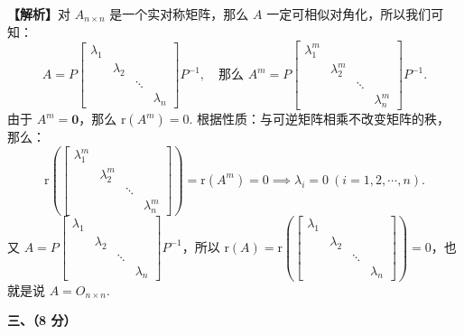 \documentclass[a4paper,11pt]{ctexart}
\newcommand{\rk}{\mathrm{r}}
\begin{document}
\begin{enumerate}[label=\arabic*., leftmargin=2em, itemsep=0.75em, topsep=0.5em]
  \textbf{【解析】}对 $A_{n \times n}$ 是一个实对称矩阵，那么 $A$ 一定可相似对角化，所以我们可知：
  \[
    A = P \begin{bmatrix} \lambda_1 & & & \\ & \lambda_2 & & \\ & & \ddots & \\ & & & \lambda_n \end{bmatrix} P^{-1},
    \quad\text{那么 }
    A^m = P \begin{bmatrix} \lambda_1^m & & & \\ & \lambda_2^m & & \\ & & \ddots & \\ & & & \lambda_n^m \end{bmatrix} P^{-1}.
  \]
  由于 $A^m = \mathbf{0}$，那么 $\rk(A^m) = 0$. 根据性质：与可逆矩阵相乘不改变矩阵的秩，那么：
  \[
    \rk\left(\begin{bmatrix} \lambda_1^m & & & \\ & \lambda_2^m & & \\ & & \ddots & \\ & & & \lambda_n^m \end{bmatrix}\right) = \rk(A^m) = 0 \implies \lambda_i = 0\ (i = 1, 2, \cdots, n).
  \]
  又 $A = P \begin{bmatrix} \lambda_1 & & & \\ & \lambda_2 & & \\ & & \ddots & \\ & & & \lambda_n \end{bmatrix} P^{-1}$，所以 $\rk(A) = \rk\left(\begin{bmatrix} \lambda_1 & & & \\ & \lambda_2 & & \\ & & \ddots & \\ & & & \lambda_n \end{bmatrix}\right) = 0$，也就是说 $A = O_{n \times n}$.
\end{enumerate}

\vspace{0.8em}

\textbf{三、（8 分）}
\end{document}
